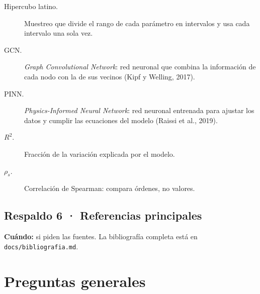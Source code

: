 \begin{terminos}
\begin{description}
\item[Hipercubo latino.] Muestreo que divide el rango de cada parámetro en intervalos y
usa cada intervalo una sola vez.
\item[GCN.] \emph{Graph Convolutional Network}: red neuronal que combina la información
de cada nodo con la de sus vecinos (Kipf y Welling, 2017).
\item[PINN.] \emph{Physics-Informed Neural Network}: red neuronal entrenada para ajustar
los datos y cumplir las ecuaciones del modelo (Raissi et al., 2019).
\item[$R^2$.] Fracción de la variación explicada por el modelo.
\item[$\rho_s$.] Correlación de Spearman: compara órdenes, no valores.
\end{description}
\end{terminos}

\subsection*{Respaldo 6 · Referencias principales}
\textbf{Cuándo:} si piden las fuentes. La bibliografía completa está en
\texttt{docs/bibliografia.md}.

\section{Preguntas generales}

